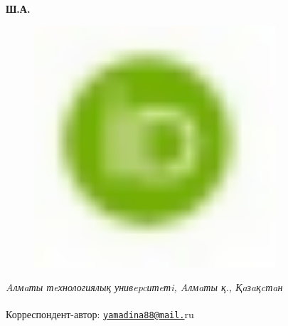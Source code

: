 {\bfseries Ш.А.
\begin{figure}[H]
	\centering
	\includegraphics[width=0.8\textwidth]{media/pish2/image17}
	\caption*{}
\end{figure}


\emph{Aлмaты тeхнологиялық унивepcитeтi, Aлмaты қ., Қaзaқcтaн}

{\bfseries \textsuperscript{\envelope }}Корреспондент-автор:
\href{mailto:yamadina88@mail.}{\nolinkurl{yamadina88@mail.}}ru

}
